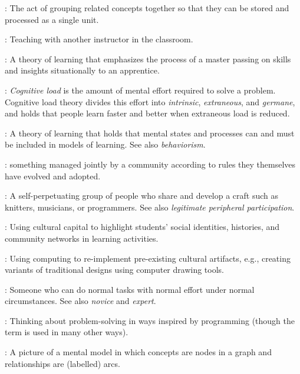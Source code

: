 \begin{description}
: The act of grouping related concepts together so
that they can be stored and processed as a single unit.

: Teaching with another instructor in the
classroom.

: A theory of
learning that emphasizes the process of a master passing on skills and insights
situationally to an apprentice.

: \emph{Cognitive load} is
the amount of mental effort required to solve a problem.  Cognitive load theory
divides this effort into \emph{intrinsic}, \emph{extraneous}, and
\emph{germane}, and holds that people learn faster and better when extraneous
load is reduced.

: A theory of learning that holds that mental
states and processes can and must be included in models of learning. See also
\emph{behaviorism}.

: something managed jointly by a community according
to rules they themselves have evolved and adopted.

: A self-perpetuating
group of people who share and develop a craft such as knitters, musicians, or
programmers. See also \emph{legitimate peripheral participation}.

: Using cultural
capital to highlight students' social identities, histories, and community
networks in learning activities.

: Using computing
to re-implement pre-existing cultural artifacts, e.g., creating variants of
traditional designs using computer drawing tools.

: Someone who can do
normal tasks with normal effort under normal circumstances.  See also
\emph{novice} and \emph{expert}.

: Thinking about
problem-solving in ways inspired by programming (though the term is used in many
other ways).

: A picture of a mental model in which
concepts are nodes in a graph and relationships are (labelled) arcs.


\end{description}
